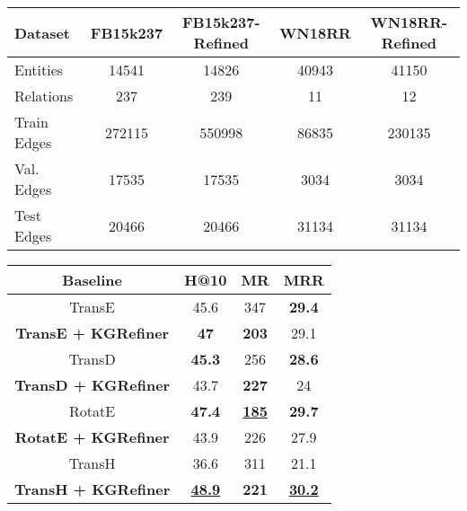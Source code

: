 \documentclass{article} \usepackage{iclr2022_conference,times}
\begin{document}
\begin{table*}[h]
  \begin{center}
\begin{tabular}{l|c|c|c|c} 
      \textbf{Dataset} & \textbf{FB15k237} & \textbf{FB15k237-Refined}& \textbf{WN18RR} & \textbf{WN18RR-Refined}\\
      \hline
      Entities & 14541 & 14826& 40943& 41150\\
      Relations & 237 & 239& 11& 12\\
      Train Edges & 272115 & 550998& 86835& 230135\\
      Val. Edges & 17535 & 17535& 3034& 3034\\
      Test Edges & 20466 & 20466& 31134& 31134\\
    \end{tabular}
    \caption{Statistics of the experimental datasets. The refined version represents that graph has some auxiliary nodes.}
\bigskip
\begin{tabular}{|c|ccc|}
\hline
Baseline                    & H@10                & MR                 & MRR                 \\ \hline
TransE                      & 45.6                & 347                & \textbf{29.4}                \\
\textbf{TransE + KGRefiner} & \textbf{47}         & \textbf{203}       & 29.1                \\ \hline
TransD                      & \textbf{45.3}       & 256                & \textbf{28.6}       \\
\textbf{TransD + KGRefiner} & 43.7                & \textbf{227}       & 24                  \\ \hline
RotatE                      & \textbf{47.4}       & {\ul \textbf{185}} & \textbf{29.7}       \\
\textbf{RotatE + KGRefiner} & 43.9                & 226                & 27.9                \\ \hline
TransH                      & 36.6                & 311                & 21.1                \\
\textbf{TransH + KGRefiner} & {\ul \textbf{48.9}} & \textbf{221}       & {\ul \textbf{30.2}} \\ \hline
\end{tabular}
 \caption{Link prediction results on FB15K237 and its refined version. Results of TransE is taken from \protect\citep{convkb}, TransH and TransD from \protect\citep{zhang2018knowledge}, but for RotatE we used \protect\citep{han2018openke} to produce scores.}

\end{center}
\end{table*}
\end{document}
